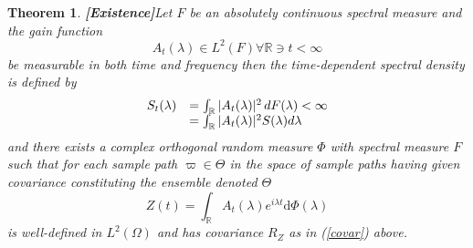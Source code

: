 \documentclass{article}
\newcommand{\mathd}{\mathrm{d}}
\newcommand{\tmstrong}[1]{\textbf{#1}}
\newtheorem{theorem}{Theorem}
\begin{document}
\begin{theorem}
  {\tmstrong{[Existence]}}\label{thm:existence_osc} Let $F$ be an absolutely
  continuous spectral measure and the gain function
  \begin{equation}
    A_t (\lambda) \in L^2 (F) \forall \mathbb{R} \ni t < \infty
  \end{equation}
  be measurable in both time and frequency then the time-dependent spectral
  density is defined by
  \begin{equation}
    \begin{array}{ll}
      S_t (\lambda) & = \int_{\mathbb{R}} |A_t (\lambda) |^2  \hspace{0.17em}
      dF (\lambda) < \infty\\
      & = \int_{\mathbb{R}} |A_t (\lambda) |^2 S (\lambda) d \lambda
    \end{array}
  \end{equation}
  and there exists a complex orthogonal random measure $\Phi$ with spectral
  measure $F$ such that for each sample path $\varpi \in \Theta$ in the space
  of sample paths having given covariance constituting the ensemble denoted
  $\Theta$
  \begin{equation}
    Z (t) = \int_{\mathbb{R}} A_t (\lambda) e^{i \lambda t} \mathd \Phi
    (\lambda)
  \end{equation}
  is well-defined in $L^2 (\Omega)$ and has covariance $R_Z$ as in
  (\ref{covar}) above.
\end{theorem}
\end{document}
